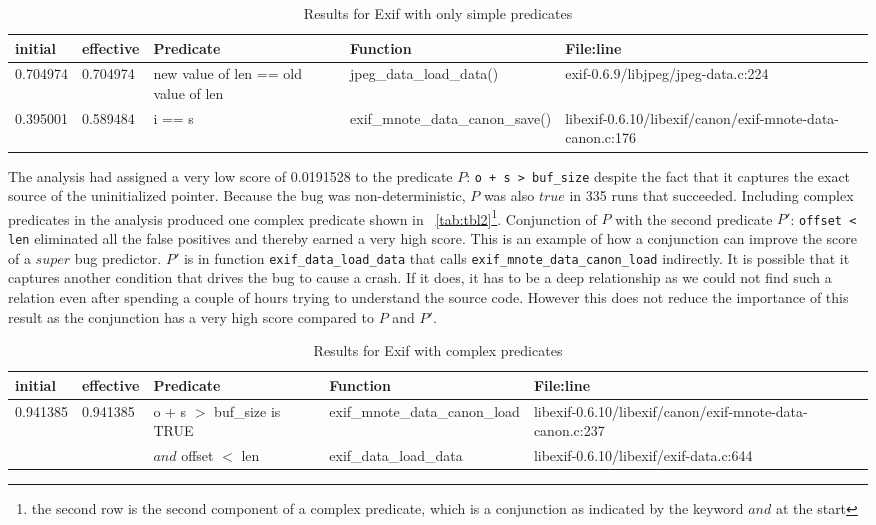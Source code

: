 \begin{table*}
\caption{Results for Exif with only simple predicates}
\label{tab:tbl1}
\centering
\scriptsize
\begin{tabular}{lllll}
\toprule
initial & effective & Predicate & Function & File:line \\
\midrule
0.704974 & 0.704974 & new value of len == old value of len & jpeg\_data\_load\_data() & exif-0.6.9/libjpeg/jpeg-data.c:224 \\
0.395001 & 0.589484 & i == s & exif\_mnote\_data\_canon\_save() & libexif-0.6.10/libexif/canon/exif-mnote-data-canon.c:176 \\
\bottomrule
\end{tabular}
\end{table*}

The analysis had assigned a very low score of 0.0191528 to the predicate $P$: \texttt{o + s > buf\_size} despite the fact that it captures the exact source of the uninitialized pointer.  Because the bug was non-deterministic, $P$ was also $true$ in 335 runs that succeeded.  Including complex predicates in the analysis produced one complex predicate shown in ~\autoref{tab:tbl2}{\footnote{the second row is the second component of a complex predicate, which is a conjunction as indicated by the keyword $and$ at the start}}.  Conjunction of $P$ with the second predicate $P'$: \texttt{offset < len} eliminated all the false positives and thereby earned a very high score.  This is an example of how a conjunction can improve the score of a $super$ bug predictor.  $P'$ is in function \texttt{exif\_data\_load\_data} that calls \texttt{exif\_mnote\_data\_canon\_load} indirectly.  It is possible that it captures another condition that drives the bug to cause a crash.  If it does, it has to be a deep relationship as we could not find such a relation even after spending a couple of hours trying to understand the source code.  However this does not reduce the importance of this result as the conjunction has a very high score compared to $P$ and $P'$.

\begin{table*}
\caption{Results for Exif with complex predicates}
\label{tab:tbl2}
\centering
\scriptsize
\begin{tabular}{lllll}
\toprule
initial & effective & Predicate & Function & File:line \\
\midrule
0.941385 & 0.941385 & o + s $>$ buf\_size is TRUE & exif\_mnote\_data\_canon\_load &
 libexif-0.6.10/libexif/canon/exif-mnote-data-canon.c:237 \\
 
         &          & $and$ offset $<$ len & exif\_data\_load\_data & libexif-0.6.10/libexif/exif-data.c:644 \\
\bottomrule
\end{tabular}
\end{table*}

